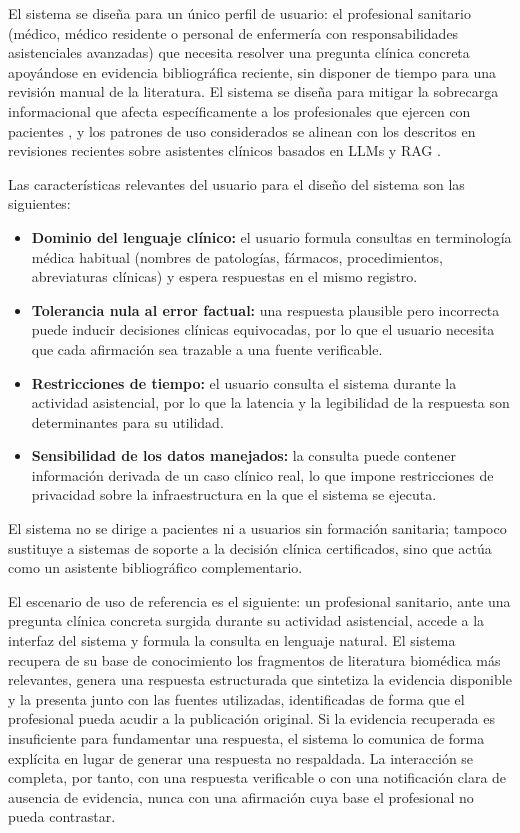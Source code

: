 \documentclass[11pt,a4paper,spanish]{book}
\numberwithin{equation}{chapter}
\numberwithin{figure}{chapter}
\begin{document}
El sistema se diseña para un único perfil de usuario: el profesional sanitario (médico, médico residente o personal de enfermería con responsabilidades asistenciales avanzadas) que necesita resolver una pregunta clínica concreta apoyándose en evidencia bibliográfica reciente, sin disponer de tiempo para una revisión manual de la literatura. El sistema se diseña para mitigar la sobrecarga informacional que afecta específicamente a los profesionales que ejercen con pacientes \cite{rebitzer_influence_2008, laker_quality_2018}, y los patrones de uso considerados se alinean con los descritos en revisiones recientes sobre asistentes clínicos basados en LLMs y RAG \cite{jcm13113041, amugongo_retrieval_2025}.

Las características relevantes del usuario para el diseño del sistema son las siguientes:

\begin{itemize}
  \item \textbf{Dominio del lenguaje clínico:} el usuario formula consultas en terminología médica habitual (nombres de patologías, fármacos, procedimientos, abreviaturas clínicas) y espera respuestas en el mismo registro.
  \item \textbf{Tolerancia nula al error factual:} una respuesta plausible pero incorrecta puede inducir decisiones clínicas equivocadas, por lo que el usuario necesita que cada afirmación sea trazable a una fuente verificable.
  \item \textbf{Restricciones de tiempo:} el usuario consulta el sistema durante la actividad asistencial, por lo que la latencia y la legibilidad de la respuesta son determinantes para su utilidad.
  \item \textbf{Sensibilidad de los datos manejados:} la consulta puede contener información derivada de un caso clínico real, lo que impone restricciones de privacidad sobre la infraestructura en la que el sistema se ejecuta.
\end{itemize}

El sistema no se dirige a pacientes ni a usuarios sin formación sanitaria; tampoco sustituye a sistemas de soporte a la decisión clínica certificados, sino que actúa como un asistente bibliográfico complementario.

El escenario de uso de referencia es el siguiente: un profesional sanitario, ante una pregunta clínica concreta surgida durante su actividad asistencial, accede a la interfaz del sistema y formula la consulta en lenguaje natural. El sistema recupera de su base de conocimiento los fragmentos de literatura biomédica más relevantes, genera una respuesta estructurada que sintetiza la evidencia disponible y la presenta junto con las fuentes utilizadas, identificadas de forma que el profesional pueda acudir a la publicación original. Si la evidencia recuperada es insuficiente para fundamentar una respuesta, el sistema lo comunica de forma explícita en lugar de generar una respuesta no respaldada. La interacción se completa, por tanto, con una respuesta verificable o con una notificación clara de ausencia de evidencia, nunca con una afirmación cuya base el profesional no pueda contrastar.
\end{document}
